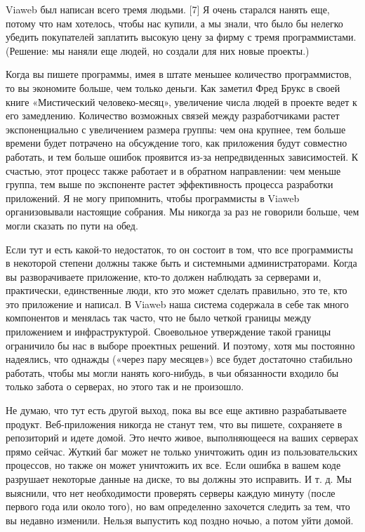 \documentclass[ebook,12pt,oneside,openany]{memoir}
\begin{document}
Viaweb был написан всего тремя людьми. [7] Я очень старался нанять
еще, потому что нам хотелось, чтобы нас купили, а мы знали, что было
бы нелегко убедить покупателей заплатить высокую цену за фирму с тремя
программистами. (Решение: мы наняли еще людей, но создали для них
новые проекты.)

Когда вы пишете программы, имея в штате меньшее количество
программистов, то вы экономите больше, чем только деньги. Как заметил
Фред Брукс в своей книге «Мистический человеко-месяц», увеличение
числа людей в проекте ведет к его замедлению. Количество возможных
связей между разработчиками растет экспоненциально с увеличением
размера группы: чем она крупнее, тем больше времени будет потрачено на
обсуждение того, как приложения будут совместно работать, и тем больше
ошибок проявится из-за непредвиденных зависимостей. К счастью, этот
процесс также работает и в обратном направлении: чем меньше группа,
тем выше по экспоненте растет эффективность процесса разработки
приложений. Я не могу припомнить, чтобы программисты в Viaweb
организовывали настоящие собрания. Мы никогда за раз не говорили
больше, чем могли сказать по пути на обед.

Если тут и есть какой-то недостаток, то он состоит в том, что все
программисты в некоторой степени должны также быть и системными
администраторами. Когда вы разворачиваете приложение, кто-то должен
наблюдать за серверами и, практически, единственные люди, кто это
может сделать правильно, это те, кто это приложение и написал. В
Viaweb наша система содержала в себе так много компонентов и менялась
так часто, что не было четкой границы между приложением и
инфраструктурой. Своевольное утверждение такой границы ограничило бы
нас в выборе проектных решений. И поэтому, хотя мы постоянно
надеялись, что однажды («через пару месяцев») все будет достаточно
стабильно работать, чтобы мы могли нанять кого-нибудь, в чьи
обязанности входило бы только забота о серверах, но этого так и не
произошло.

Не думаю, что тут есть другой выход, пока вы все еще активно
разрабатываете продукт. Веб-приложения никогда не станут тем, что вы
пишете, сохраняете в репозиторий и идете домой. Это нечто живое,
выполняющееся на ваших серверах прямо сейчас. Жуткий баг может не
только уничтожить один из пользовательских процессов, но также он
может уничтожить их все. Если ошибка в вашем коде разрушает некоторые
данные на диске, то вы должны это исправить. И т. д. Мы выяснили, что
нет необходимости проверять серверы каждую минуту (после первого года
или около того), но вам определенно захочется следить за тем, что вы
недавно изменили. Нельзя выпустить код поздно ночью, а потом уйти
домой.
\end{document}
